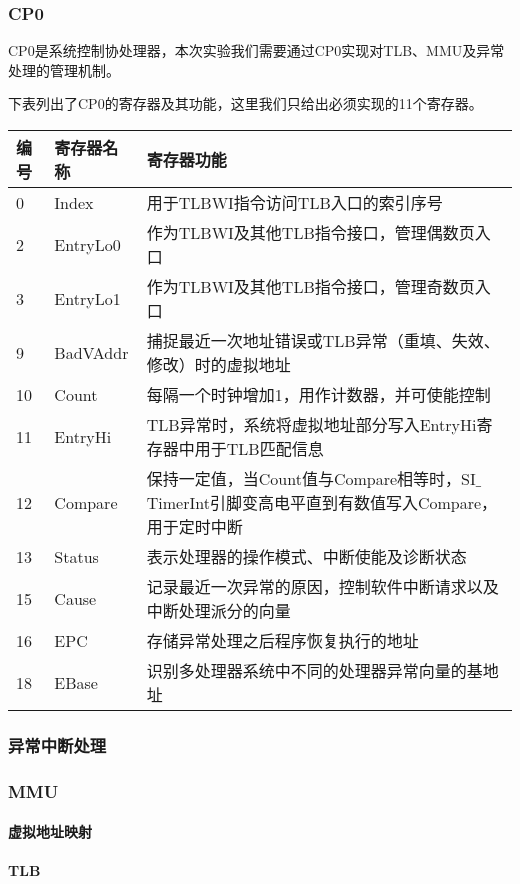 \subsubsection{CP0}
CP0是系统控制协处理器，本次实验我们需要通过CP0实现对TLB、MMU及异常处理的管理机制。

下表列出了CP0的寄存器及其功能，这里我们只给出必须实现的11个寄存器。

\begin{table}[ht]
\centering
\begin{tabular}{lll}
\hline
编号&寄存器名称&寄存器功能\\
\hline
0&Index&用于TLBWI指令访问TLB入口的索引序号\\
2&EntryLo0&作为TLBWI及其他TLB指令接口，管理偶数页入口\\
3&EntryLo1&作为TLBWI及其他TLB指令接口，管理奇数页入口\\
9&BadVAddr&捕捉最近一次地址错误或TLB异常（重填、失效、修改）时的虚拟地址\\
10&Count&每隔一个时钟增加1，用作计数器，并可使能控制\\
11&EntryHi&TLB异常时，系统将虚拟地址部分写入EntryHi寄存器中用于TLB匹配信息\\
12&Compare&保持一定值，当Count值与Compare相等时，SI$\_$TimerInt引脚变高电平直到有数值写入Compare，用于定时中断\\
13&Status&表示处理器的操作模式、中断使能及诊断状态\\
15&Cause&记录最近一次异常的原因，控制软件中断请求以及中断处理派分的向量\\
16&EPC&存储异常处理之后程序恢复执行的地址\\
18&EBase&识别多处理器系统中不同的处理器异常向量的基地址\\
\hline
\end{tabular}
\end{table}

\subsubsection{异常中断处理}
\subsubsection{MMU}
\paragraph{虚拟地址映射}
\paragraph{TLB}

